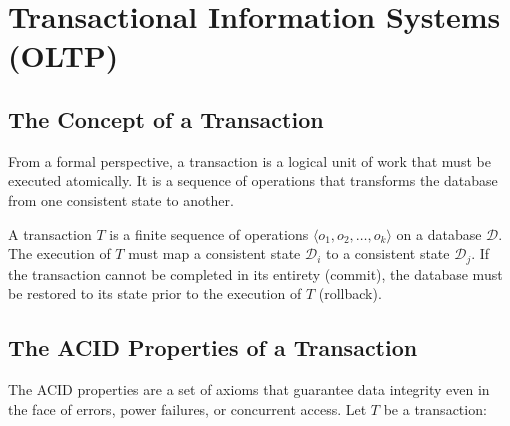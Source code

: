 \section{Transactional Information Systems (OLTP)}

\subsection{The Concept of a Transaction}

From a formal perspective, a transaction is a logical unit of work that must be executed atomically. It is a sequence of operations that transforms the database from one consistent state to another.

\begin{definition}[Transaction]
A transaction $T$ is a finite sequence of operations $\langle o_1, o_2, \dots, o_k \rangle$ on a database $\mathcal{D}$. The execution of $T$ must map a consistent state $\mathcal{D}_i$ to a consistent state $\mathcal{D}_j$. If the transaction cannot be completed in its entirety (commit), the database must be restored to its state prior to the execution of $T$ (rollback).
\end{definition}

\subsection{The ACID Properties of a Transaction}

The ACID properties are a set of axioms that guarantee data integrity even in the face of errors, power failures, or concurrent access. Let $T$ be a transaction:

